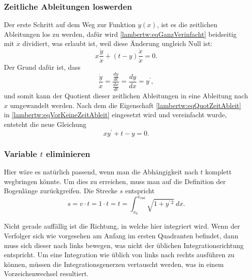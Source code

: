 \subsubsection{Zeitliche Ableitungen loswerden
	\label{lambertw:subsubsection:ZeitAbleit}}
Der erste Schritt auf dem Weg zur Funktion \(y(x)\), ist es die zeitlichen Ableitungen los zu werden, dafür wird \eqref{lambertw:eqGanzVerinfacht} beidseitig mit \(\dot{x}\) dividiert, was erlaubt ist, weil diese Änderung ungleich Null ist:
\begin{equation}
	x \frac{\dot{y}}{\dot{x}} + (t-y) \frac{\dot{x}}{\dot{x}}
	= 0.
	\label{lambertw:eqVorKeineZeitAbleit}
\end{equation}
Der Grund dafür ist, dass
\begin{equation}
	\frac{\displaystyle\dot{y}}{\displaystyle\dot{x}} 
	= \frac{\displaystyle\frac{dy}{dt}}{\displaystyle\frac{dx}{dt}}  
	= \frac{dy}{dx}
	= y^{\prime},
	\label{lambertw:eqQuotZeitAbleit}
\end{equation}
und somit kann der Quotient dieser zeitlichen Ableitungen in eine Ableitung nach \(x\) umgewandelt werden.
Nach dem die Eigenschaft \eqref{lambertw:eqQuotZeitAbleit} in \eqref{lambertw:eqVorKeineZeitAbleit} eingesetzt wird und vereinfacht wurde, entsteht die neue Gleichung
\begin{equation}
	x y^{\prime} + t - y
	= 0.
	\label{lambertw:DGLmitT}
\end{equation}

\subsubsection{Variable \(t\) eliminieren
	\label{lambertw:subsubsection:ZeitAbleit}}
Hier wäre es natürlich passend, wenn man die Abhängigkeit nach \(t\) komplett wegbringen könnte. Um dies zu erreichen, muss man auf die Definition der Bogenlänge zurückgreifen. 
Die Strecke \(s\) entspricht 
\begin{equation}
	s
	= 
	v \cdot t
	=
	1 \cdot t
	=
	t
	=
	\int_{\displaystyle x_0}^{\displaystyle x_{\text{end}}}\sqrt{1+y^{\prime\, 2}} \: dx.
	\label{lambertw:eqZuBogenlaenge}
\end{equation}

Nicht gerade auffällig ist die Richtung, in welche hier integriert wird. Wenn der Verfolger sich wie vorgesehen am Anfang im ersten Quadranten befindet, dann muss sich dieser nach links bewegen, was nicht der üblichen Integrationsrichtung entspricht. Um eine Integration wie üblich von links nach rechts ausführen zu können, müssen die Integrationsgenerzen vertauscht werden, was in einem Vorzeichenwechsel resultiert. 


